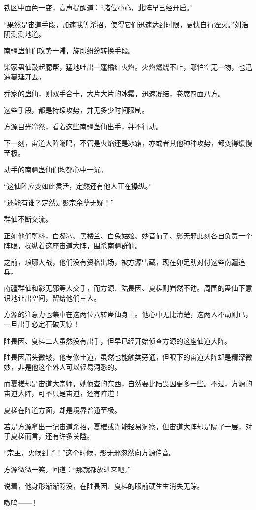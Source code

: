 \begin{this_body}
铁区中面色一变，高声提醒道：“诸位小心，此阵早已经开启。”

“果然是宙道手段，加速我等杀招，使得它们迅速达到时限，更快自行湮灭。”刘浩阴测测地道。

南疆蛊仙们攻势一滞，旋即纷纷转换手段。

柴家蛊仙鼓起腮帮，猛地吐出一蓬橘红火焰。火焰燃烧不止，哪怕空无一物，也迅速蔓延开去。

乔家的蛊仙，则双手合十，大片大片的冰霜，迅速凝结，卷席四面八方。

这些手段，都是持续攻势，并无多少时间限制。

方源目光冷然，看着这些南疆蛊仙出手，并不行动。

下一刻，宙道大阵嗡鸣，不管是火焰还是冰霜，亦或者其他种种攻势，都变得缓慢至极。

动手的南疆蛊仙们均都心中一沉。

“这仙阵应变如此灵活，定然还有他人正在操纵。”

“还能有谁？定然是影宗余孽无疑！”

群仙不断交流。

正如他们所料，白凝冰、黑楼兰、白兔姑娘、妙音仙子、影无邪此刻各自负责一个阵眼，操纵着这座宙道大阵，围杀南疆群仙。

之前，琅琊大战，他们没有资格出场，被方源雪藏，现在卯足劲对付这些南疆追兵。

南疆群仙和影无邪等人交手，而方源、陆畏因、夏槎则岿然不动。周围的蛊仙下意识地让出空间，留给他们三人。

方源的注意力也集中在这两位八转蛊仙身上。他心中无比清楚，这两人不动则已，一旦出手必定石破天惊！

陆畏因、夏槎二人虽然没有出手，但早已经开始侦查方源的这座仙道大阵。

陆畏因眉头微皱，他专修土道，虽然也能触类旁通，但眼下的宙道大阵却是精深微妙，非是他这个外人可以轻易洞悉的。

而夏槎却是宙道大宗师，她侦查的东西，自然要比陆畏因更多一些。不过，方源的宙道大阵，可不只是宙道，还有阵道！

夏槎在阵道方面，却是境界普通至极。

若是方源拿出一记宙道杀招，夏槎或许能轻易洞察，但宙道大阵却是隔了一层，对于夏槎而言，还有许多关隘。

“宗主，火候到了！”这个时候，影无邪忽然向方源传音。

方源微微一笑，回道：“那就都放进来吧。”

说着，他身形渐渐隐没，在陆畏因、夏槎的眼前硬生生消失无踪。

嗷呜——！


\end{this_body}
